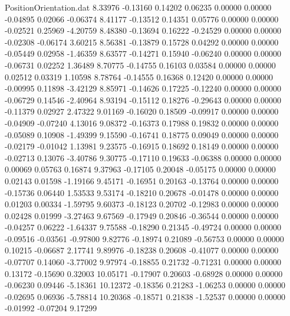 \begin{filecontents}{PositionOrientation.dat}
   8.33976   -0.13160    0.14202     0.06235    0.00000    0.00000   -0.04895    0.02066   -0.06374
   8.41177   -0.13512    0.14351     0.05776    0.00000    0.00000   -0.02521    0.25969   -4.20759
   8.48380   -0.13694    0.16222    -0.24529    0.00000    0.00000   -0.02308   -0.06174    3.60215
   8.56381   -0.13879    0.15728     0.04292    0.00000    0.00000   -0.05449    0.02958   -1.46359
   8.63577   -0.14271    0.15940    -0.06240    0.00000    0.00000   -0.06731    0.02252    1.36489
   8.70775   -0.14755    0.16103     0.03584    0.00000    0.00000    0.02512    0.03319    1.10598
   8.78764   -0.14555    0.16368     0.12420    0.00000    0.00000   -0.00995    0.11898   -3.42129
   8.85971   -0.14626    0.17225    -0.12240    0.00000    0.00000   -0.06729    0.14546   -2.40964
   8.93194   -0.15112    0.18276    -0.29643    0.00000    0.00000   -0.11379    0.02927    2.47322
   9.01169   -0.16020    0.18509    -0.09917    0.00000    0.00000   -0.04909   -0.07240    4.13016
   9.08372   -0.16373    0.17988     0.19832    0.00000    0.00000   -0.05089    0.10908   -1.49399
   9.15590   -0.16741    0.18775     0.09049    0.00000    0.00000   -0.02179   -0.01042    1.13981
   9.23575   -0.16915    0.18692     0.18149    0.00000    0.00000   -0.02713    0.13076   -3.40786
   9.30775   -0.17110    0.19633    -0.06388    0.00000    0.00000    0.00069    0.05763    0.16874
   9.37963   -0.17105    0.20048    -0.05175    0.00000    0.00000    0.02143    0.01598   -1.19166
   9.45171   -0.16951    0.20163    -0.13764    0.00000    0.00000   -0.15736    0.06440    1.53533
   9.53174   -0.18210    0.20678    -0.01478    0.00000    0.00000    0.01203    0.00334   -1.59795
   9.60373   -0.18123    0.20702    -0.12983    0.00000    0.00000    0.02428    0.01999   -3.27463
   9.67569   -0.17949    0.20846    -0.36544    0.00000    0.00000   -0.04257    0.06222   -1.64337
   9.75588   -0.18290    0.21345    -0.49724    0.00000    0.00000   -0.09516   -0.03561   -0.97800
   9.82776   -0.18974    0.21089    -0.56753    0.00000    0.00000    0.10215   -0.06687    2.17741
   9.89976   -0.18238    0.20608    -0.41077    0.00000    0.00000   -0.07707    0.14060   -3.77002
   9.97974   -0.18855    0.21732    -0.71231    0.00000    0.00000    0.13172   -0.15690    0.32003
  10.05171   -0.17907    0.20603    -0.68928    0.00000    0.00000   -0.06230    0.09446   -5.18361
  10.12372   -0.18356    0.21283    -1.06253    0.00000    0.00000   -0.02695    0.06936   -5.78814
  10.20368   -0.18571    0.21838    -1.52537    0.00000    0.00000   -0.01992   -0.07204    9.17299

\end{filecontents}
